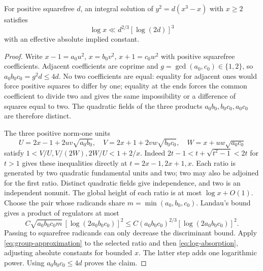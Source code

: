 \begin{proposition}\label{prop:split-cubic}
For positive squarefree $d$, an integral solution of
$y^2=d(x^3-x)$ with $x\ge2$ satisfies
\[
 \log x\ll d^{2/3}[\log(2d)]^3
\]
with an effective absolute implied constant.
\end{proposition}
\begin{proof}
Write $x-1=a_0u^2$, $x=b_0v^2$, $x+1=c_0w^2$ with positive squarefree
coefficients. Adjacent coefficients are coprime and
$g=\gcd(a_0,c_0)\in\{1,2\}$, so $a_0b_0c_0=g^2d\le4d$.
No two coefficients are equal: equality for adjacent ones would force
positive squares to differ by one; equality at the ends forces the common
coefficient to divide two and gives the same impossibility or a difference
of squares equal to two. The quadratic fields of the three products
$a_0b_0,b_0c_0,a_0c_0$ are therefore distinct.

The three positive norm-one units
\[
 U=2x-1+2uv\sqrt{a_0b_0},\quad
 V=2x+1+2vw\sqrt{b_0c_0},\quad
 W=x+uw\sqrt{a_0c_0}
\]
satisfy $1<V/U,V/(2W),2W/U<1+2/x$.
Indeed $2t-1<t+\sqrt{t^2-1}<2t$ for $t>1$ gives these inequalities
directly at $t=2x-1,2x+1,x$.
Each ratio is generated by two quadratic fundamental units and two;
two may also be adjoined for the first ratio. Distinct quadratic fields
give independence, and two is an independent nonunit. The global height
of each ratio is at most $\log x+O(1)$.
Choose the pair whose radicands share
$m=\min(a_0,b_0,c_0)$. Landau's bound gives a product of regulators at most
\[
 C\sqrt{a_0b_0c_0m}\,[\log(2a_0b_0c_0)]^2
 \le C(a_0b_0c_0)^{2/3}[\log(2a_0b_0c_0)]^2.
\]
Passing to squarefree radicands can only decrease the discriminant bound.
Apply \eqref{eq:group-approximation} to the selected ratio and then
\eqref{eq:log-absorption}, adjusting absolute constants for bounded $x$.
The latter step adds one logarithmic power. Using $a_0b_0c_0\le4d$
proves the claim.
\end{proof}
